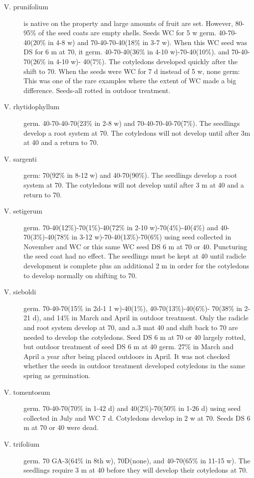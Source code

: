 \begin{description}
\item[V. prunifolium] is native on the property and large amounts of fruit are set.
However, 80-95\% of the seed coats are empty shells. Seeds WC for 5 w germ. 40-70-
40(20\% in 4-8 w) and 70-40-70-40(18\% in 3-7 w). When this WC seed was DS for 6
m at 70, it germ. 40-70-40(36\% in 4-10 w)-70-40(10\%). and 70-40-70(26\% in 4-10 w)-
40(7\%). The cotyledons developed quickly after the shift to 70. When the seeds were
WC for 7 d instead of 5 w, none germ: This was one of the rare examples where the
extent of WC made a big difference. Seeds-all rotted in outdoor treatment.
\item[V. rhytidophyllum] germ. 40-70-40-70(23\% in 2-8 w) and 70-40-70-40-70(7\%).
The seedlings develop a root system at 70. The cotyledons will not develop until after
3m at 40 and a return to 70.
\item[V. sargenti] germ: 70(92\% in 8-12 w) and 40-70(90\%). The seedlings develop a
root system at 70. The cotyledons will not develop until after 3 m at 40 and a return to
70.
\item[V. setigerum] germ. 70-40(12\%)-70(1\%)-40(72\% in 2-10 w)-70(4\%)-40(4\%) and
40-70(3\%)-40(78\% in 3-12 w)-70-40(13\%)-70(6\%) using seed collected in November
and WC or this same WC seed DS 6 m at 70 or 40. Puncturing the seed coat had no
effect. The seedlings must be kept at 40 until radicle development is complete plus an
additional 2 m in order for the cotyledons to develop normally on shifting to 70.
\item[V. sieboldi] germ. 70-40-70(15\% in 2d-1 1 w)-40(1\%), 40-70(13\%)-40(6\%)-
70(38\% in 2-21 d), and 14\% in March and April in outdoor treatment. Only the radicle
and root system develop at 70, and a.3 mat 40 and shift back to 70 are needed to
develop the cotyledons. Seed DS 6 m at 70 or 40 largely rotted, but outdoor treatment
of seed DS 6 m at 40 germ. 27\% in March and April a year after being placed outdoors
in April. It was not checked whether the seeds in outdoor treatment developed
cotyledons in the same spring as germination.
\item[V. tomentosum] germ. 70-40-70(70\% in 1-42 d) and 40(2\%)-70(50\% in 1-26 d)
using seed collected in July and WC 7 d. Cotyledons develop in 2 w at 70. Seeds DS
6 m at 70 or 40 were dead.
\item[V. trifolium] germ. 70 GA-3(64\% in 8th w), 70D(none), and 40-70(65\% in 11-15
w). The seedlings require 3 m at 40 before they will develop their cotyledons at 70.


\end{description}
